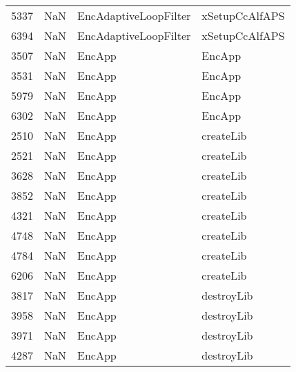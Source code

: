 \begin{tabular}{llll}
5337 &                   NaN &      EncAdaptiveLoopFilter &                            xSetupCcAlfAPS \\
6394 &                   NaN &      EncAdaptiveLoopFilter &                            xSetupCcAlfAPS \\
3507 &                   NaN &                     EncApp &                                    EncApp \\
3531 &                   NaN &                     EncApp &                                    EncApp \\
5979 &                   NaN &                     EncApp &                                    EncApp \\
6302 &                   NaN &                     EncApp &                                    EncApp \\
2510 &                   NaN &                     EncApp &                                 createLib \\
2521 &                   NaN &                     EncApp &                                 createLib \\
3628 &                   NaN &                     EncApp &                                 createLib \\
3852 &                   NaN &                     EncApp &                                 createLib \\
4321 &                   NaN &                     EncApp &                                 createLib \\
4748 &                   NaN &                     EncApp &                                 createLib \\
4784 &                   NaN &                     EncApp &                                 createLib \\
6206 &                   NaN &                     EncApp &                                 createLib \\
3817 &                   NaN &                     EncApp &                                destroyLib \\
3958 &                   NaN &                     EncApp &                                destroyLib \\
3971 &                   NaN &                     EncApp &                                destroyLib \\
4287 &                   NaN &                     EncApp &                                destroyLib \\

\end{tabular}

